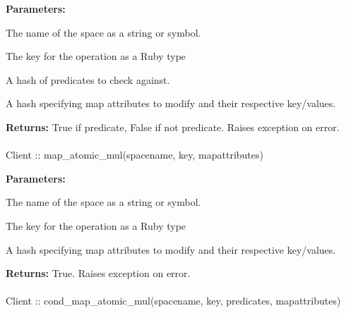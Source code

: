 \noindent\textbf{Parameters:}
\begin{description}[labelindent=\widthof{{\code{mapattributes}}},leftmargin=*,noitemsep,nolistsep,align=right]
\item[\code{spacename}] The name of the space as a string or symbol.
\item[\code{key}] The key for the operation as a Ruby type
\item[\code{predicates}] A hash of predicates to check against.
\item[\code{mapattributes}] A hash specifying map attributes to modify and their respective key/values.
\end{description}

\noindent\textbf{Returns:}
True if predicate, False if not predicate.  Raises exception on error.

\paragraph{}
\label{api:ruby:map_atomic_mul}
\begin{rubycode}
Client :: map_atomic_mul(spacename, key, mapattributes)
\end{rubycode}


\noindent\textbf{Parameters:}
\begin{description}[labelindent=\widthof{{\code{mapattributes}}},leftmargin=*,noitemsep,nolistsep,align=right]
\item[\code{spacename}] The name of the space as a string or symbol.
\item[\code{key}] The key for the operation as a Ruby type
\item[\code{mapattributes}] A hash specifying map attributes to modify and their respective key/values.
\end{description}

\noindent\textbf{Returns:}
True.  Raises exception on error.

\paragraph{}
\label{api:ruby:cond_map_atomic_mul}
\begin{rubycode}
Client :: cond_map_atomic_mul(spacename, key, predicates, mapattributes)
\end{rubycode}


